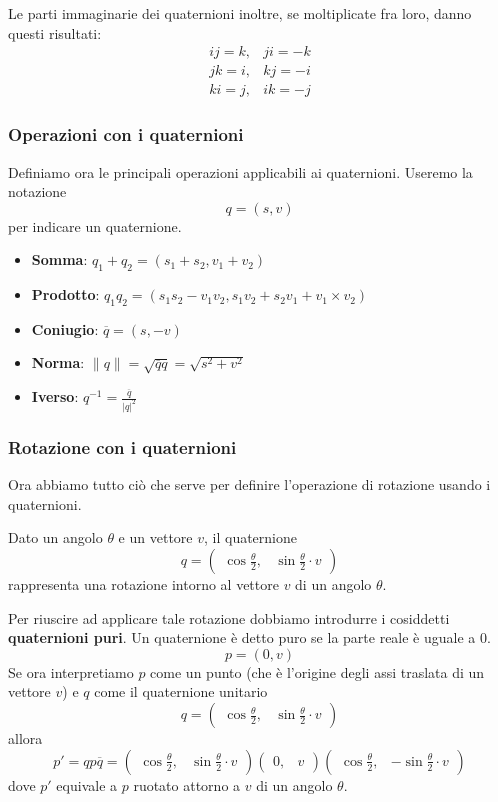 Le parti immaginarie dei quaternioni inoltre, se moltiplicate fra loro, danno questi risultati:
\[
	\begin{array}{lr}
		ij = k, & ji = -k \\
		jk = i, & kj = -i \\
		ki = j, & ik = -j
	\end{array}
\]
\subsubsection{Operazioni con i quaternioni}
Definiamo ora le principali operazioni applicabili ai quaternioni. Useremo la notazione
\[ q = (s, v) \]
per indicare un quaternione.
\begin{itemize}
	\item \textbf{Somma}: $q_1 + q_2 = (s_1 + s_2, v_1 + v_2)$
	\item \textbf{Prodotto}: $q_1 q_2 = (s_1 s_2 - v_1 v_2, s_1 v_2 + s_2 v_1 + v_1 \times v_2)$
	\item \textbf{Coniugio}: $\overline{q} = (s, -v)$
	\item \textbf{Norma}: $\| q \| = \sqrt{\overline{q} q} = \sqrt{s^2 + v^2}$
	\item \textbf{Iverso}: $q^{-1} = \displaystyle\frac{\overline{q}}{|q|^2}$
\end{itemize}

\subsubsection{Rotazione con i quaternioni}
Ora abbiamo tutto ci\`o che serve per definire l'operazione di rotazione usando i quaternioni.

Dato un angolo $\theta$ e un vettore $v$, il quaternione
\[
	q = \begin{pmatrix} \cos{\displaystyle\frac{\theta}{2}},
		 & \sin{\displaystyle\frac{\theta}{2} \cdot v}\end{pmatrix}
\]
rappresenta una rotazione intorno al vettore $v$ di un angolo $\theta$.

Per riuscire ad applicare tale rotazione dobbiamo introdurre i cosiddetti \textbf{quaternioni puri}. Un quaternione \`e
detto puro se la parte reale \`e uguale a 0.
\[ p = (0, v) \]
Se ora interpretiamo $p$ come un punto (che \`e l'origine degli assi traslata di un vettore $v$) e $q$ come il quaternione
unitario
\[
	q = \begin{pmatrix}
		\cos{\displaystyle\frac{\theta}{2}},
		 & \sin{\displaystyle\frac{\theta}{2} \cdot v}
	\end{pmatrix}
\]
allora
\[
	p' = q p \overline{q} =
	\begin{pmatrix}
		\cos{\displaystyle\frac{\theta}{2}}, & \sin{\displaystyle\frac{\theta}{2} \cdot v}
	\end{pmatrix}
	\begin{pmatrix}
		0, & v
	\end{pmatrix}
	\begin{pmatrix}
		\cos{\displaystyle\frac{\theta}{2}}, & -\sin{\displaystyle\frac{\theta}{2} \cdot v}
	\end{pmatrix}
\]
dove $p'$ equivale a $p$ ruotato attorno a $v$ di un angolo $\theta$.

